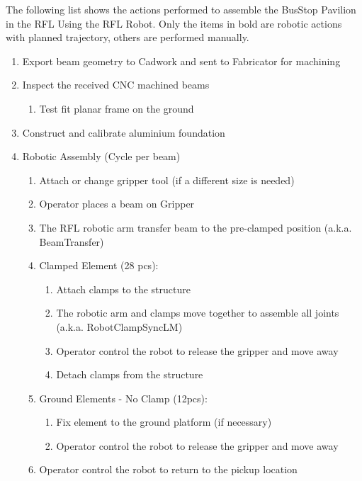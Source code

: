 The following list shows the actions performed to assemble the BusStop Pavilion in the RFL Using the RFL Robot. Only the items in bold are robotic actions with planned trajectory, others are performed manually. 
\begin{enumerate}
    \item Export beam geometry to Cadwork and sent to Fabricator for machining
    \item Inspect the received CNC machined beams
    \begin{enumerate}
        \item Test fit planar frame on the ground
    \end{enumerate}
    \item Construct and calibrate aluminium foundation 
    \item Robotic Assembly (Cycle per beam)
    \begin{enumerate}
        \item Attach or change gripper tool (if a different size is needed)
        \item Operator places a beam on Gripper
        \item The RFL robotic arm transfer beam to the pre-clamped position (a.k.a. BeamTransfer)
        \item Clamped Element (28 pcs):
        \begin{enumerate}
            \item Attach clamps to the structure 
            \item The robotic arm and clamps move together to assemble all joints (a.k.a. RobotClampSyncLM)
            \item Operator control the robot to release the gripper and move away
            \item Detach clamps from the structure
        \end{enumerate}
        \item Ground Elements - No Clamp (12pcs):
        \begin{enumerate}
            \item Fix element to the ground platform (if necessary)
            \item Operator control the robot to release the gripper and move away
        \end{enumerate}
        \item Operator control the robot to return to the pickup location 
    \end{enumerate}
\end{enumerate}

